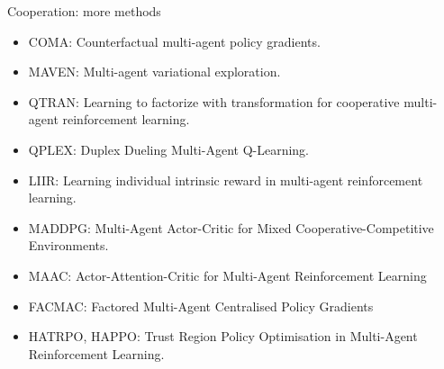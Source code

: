 \documentclass[9pt, hyperref={pdfusetitle,colorlinks=true,allcolors=DarkBlue}]{beamer}
\makeatletter
\def\blfootnote{\xdef\@thefnmark{}\@footnotetext}
\makeatother
\begin{document}



\begin{frame}{Cooperation: more methods}
\begin{itemize}
    \item COMA: Counterfactual multi-agent policy gradients.
    \vfill
    \item MAVEN: Multi-agent variational exploration.
    \vfill
    \item QTRAN: Learning to factorize with transformation for cooperative multi-agent reinforcement learning.
    \vfill
    \item QPLEX: Duplex Dueling Multi-Agent Q-Learning.
    \vfill
    \item LIIR: Learning individual intrinsic reward in multi-agent reinforcement learning.
    \vfill
    \item MADDPG: Multi-Agent Actor-Critic for Mixed Cooperative-Competitive Environments.
    \vfill
    \item MAAC: Actor-Attention-Critic for Multi-Agent Reinforcement Learning
    \vfill
    \item FACMAC: Factored Multi-Agent Centralised Policy Gradients
    \vfill
    \item HATRPO, HAPPO: Trust Region Policy Optimisation in Multi-Agent Reinforcement Learning.
\end{itemize}
\end{frame}
\end{document}
